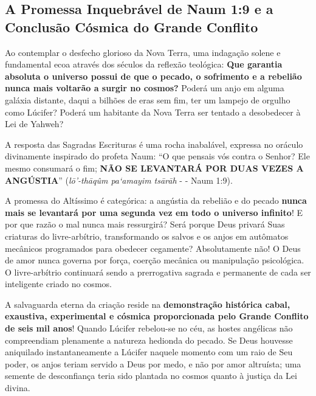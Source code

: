 \subsection{A Promessa Inquebrável de Naum 1:9 e a Conclusão Cósmica do Grande Conflito}


Ao contemplar o desfecho glorioso da Nova Terra, uma indagação solene e fundamental ecoa através dos séculos da reflexão teológica:
\textbf{Que garantia absoluta o universo possui de que o pecado, o sofrimento e a rebelião nunca mais voltarão a surgir no cosmos?}
Poderá um anjo em alguma galáxia distante, daqui a bilhões de eras sem fim, ter um lampejo de orgulho como Lúcifer? Poderá um habitante da Nova Terra ser tentado a desobedecer à Lei de Yahweh?

A resposta das Sagradas Escrituras é uma rocha inabalável, expressa no oráculo divinamente inspirado do profeta Naum:
``O que pensais vós contra o Senhor? Ele mesmo consumará o fim; \textbf{NÃO SE LEVANTARÁ POR DUAS VEZES A ANGÚSTIA}'' (\textit{lō’-thāqûm pa‘amayim tsārāh} - - Naum 1:9).

A promessa do Altíssimo é categórica: a angústia da rebelião e do pecado \textbf{nunca mais se levantará por uma segunda vez em todo o universo infinito}!
E por que razão o mal nunca mais ressurgirá?
Será porque Deus privará Suas criaturas do livre-arbítrio, transformando os salvos e os anjos em autômatos mecânicos programados para obedecer cegamente?
Absolutamente não! O Deus de amor nunca governa por força, coerção mecânica ou manipulação psicológica. O livre-arbítrio continuará sendo a prerrogativa sagrada e permanente de cada ser inteligente criado no cosmos.

A salvaguarda eterna da criação reside na \textbf{demonstração histórica cabal, exaustiva, experimental e cósmica proporcionada pelo Grande Conflito de seis mil anos}!
Quando Lúcifer rebelou-se no céu, as hostes angélicas não compreendiam plenamente a natureza hedionda do pecado. Se Deus houvesse aniquilado instantaneamente a Lúcifer naquele momento com um raio de Seu poder, os anjos teriam servido a Deus por medo, e não por amor altruísta; uma semente de desconfiança teria sido plantada no cosmos quanto à justiça da Lei divina.

